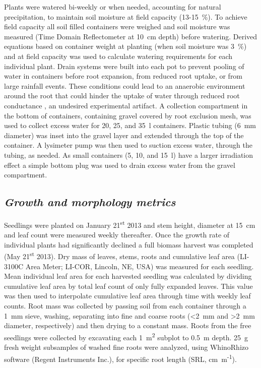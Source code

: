 \documentclass[a4paper]{article}\usepackage[]{graphicx}\usepackage[]{color}
\begin{document}
Plants were watered bi-weekly or when needed, accounting for natural precipitation, to maintain soil moisture at field capacity (13-15~\%). To achieve field capacity all soil filled containers were weighed and soil moisture was measured (Time Domain Reflectometer at 10~cm depth) before watering. Derived equations based on container weight at planting (when soil moisture was 3~\%) and at field capacity was used to calculate watering requirements for each individual plant. Drain systems were built into each pot to prevent pooling of water in containers before root expansion, from reduced root uptake, or from large rainfall events. These conditions could lead to an anaerobic environment around the root that could hinder the uptake of water through reduced root conductance \citep{poorter2009causes}, an undesired experimental artifact. A collection compartment in the bottom of containers, containing gravel covered by root exclusion mesh, was used to collect excess water for 20, 25, and 35~l containers. Plastic tubing (6~mm diameter) was inset into the gravel layer and extended through the top of the container. A lysimeter pump was then used to suction excess water, through the tubing, as needed. As small containers (5, 10, and 15~l) have a larger irradiation effect a simple bottom plug was used to drain excess water from the gravel compartment.  

\subsection*{\textit{Growth and morphology metrics}}
Seedlings were planted on January 21\textsuperscript{st} 2013 and stem height, diameter at 15~cm and leaf count were measured weekly thereafter. Once the growth rate of individual plants had significantly declined a full biomass harvest was completed (May 21\textsuperscript{st} 2013). Dry mass of leaves, stems, roots and cumulative leaf area (LI-3100C Area Meter; LI-COR, Lincoln, NE, USA) was measured for each seedling. Mean individual leaf area for each harvested seedling was calculated by dividing cumulative leaf area by total leaf count of only fully expanded leaves. This value was then used to interpolate cumulative leaf area through time with weekly leaf counts. Root mass was collected by passing soil from each container through a 1~mm sieve, washing, separating into fine and coarse roots (\textless2~mm and \textgreater2~mm diameter, respectively) and then drying to a constant mass. Roots from the free seedlings were collected by excavating each 1~m\textsuperscript{2} subplot to 0.5~m depth.  25~g fresh weight subsamples of washed fine roots were analyzed, using WhinoRhizo software (Regent Instruments Inc.), for specific root length (SRL, cm~m\textsuperscript{-1}).
\end{document}

